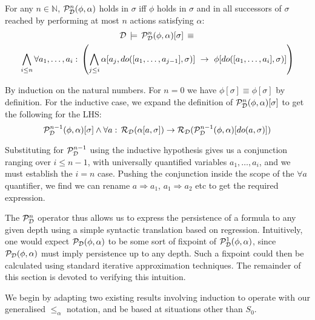 \begin{thm}
For any $n\in\mathbb{N}$, $\mathcal{P}_{\mathcal{D}}^{n}(\phi,\alpha)$ holds in
$\sigma$ iff $\phi$ holds in $\sigma$ and in all successors of
$\sigma$ reached by performing at most $n$ actions satisfying $\alpha$:\label{thm:PstN-works}\begin{multline*}
\mathcal{D}\,\models\,\mathcal{P}_{\mathcal{D}}^{n}(\phi,\alpha)[\sigma]\,\equiv\,\\
\bigwedge_{i\leq n}\forall a_{1},\dots,a_{i}:\,\left(\bigwedge_{j\leq i}\alpha[a_{j},do([a_{1},\dots,a_{j-1}],\sigma)]\,\,\rightarrow\,\,\phi[do([a_{1},\dots,a_{i}],\sigma)]\right)\end{multline*}

\end{thm}
\begin{proofsketch}
By induction on the natural numbers. For $n=0$ we have $\phi[\sigma]\equiv\phi[\sigma]$
by definition. For the inductive case, we expand the definition of
$\mathcal{P}_{\mathcal{D}}^{n}(\phi,\alpha)[\sigma]$ to get the following for the
LHS:\[
\mathcal{P}_{\mathcal{D}}^{n-1}(\phi,\alpha)[\sigma]\wedge\forall a:\,\mathcal{R}_{\mathcal{D}}(\alpha[a,\sigma])\rightarrow\mathcal{R}_{\mathcal{D}}(\mathcal{P}_{\mathcal{D}}^{n-1}(\phi,\alpha)[do(a,\sigma)])\]


Substituting for $\mathcal{P}_{\mathcal{D}}^{n-1}$ using the inductive hypothesis
gives us a conjunction ranging over $i\leq n-1$, with universally
quantified variables $a_{1},\dots,a_{i}$, and we must establish the
$i=n$ case. Pushing the conjunction inside the scope of the $\forall a$
quantifier, we find we can rename $a\Rightarrow a_{1}$, $a_{1}\Rightarrow a_{2}$
etc to get the required expression.
\end{proofsketch}
The $\mathcal{P}_{\mathcal{D}}^{n}$ operator thus allows us to express the persistence
of a formula to any given depth using a simple syntactic translation
based on regression. Intuitively, one would expect $\mathcal{P}_{\mathcal{D}}(\phi,\alpha)$
to be some sort of fixpoint of $\mathcal{P}_{\mathcal{D}}^{1}(\phi,\alpha)$, since
$\mathcal{P}_{\mathcal{D}}(\phi,\alpha)$ must imply persistence up to any depth.
Such a fixpoint could then be calculated using standard iterative
approximation techniques. The remainder of this section is devoted
to verifying this intuition.

We begin by adapting two existing results involving induction to operate
with our generalised $\leq_{\alpha}$ notation, and be based at situations
other than $S_{0}$.\\


